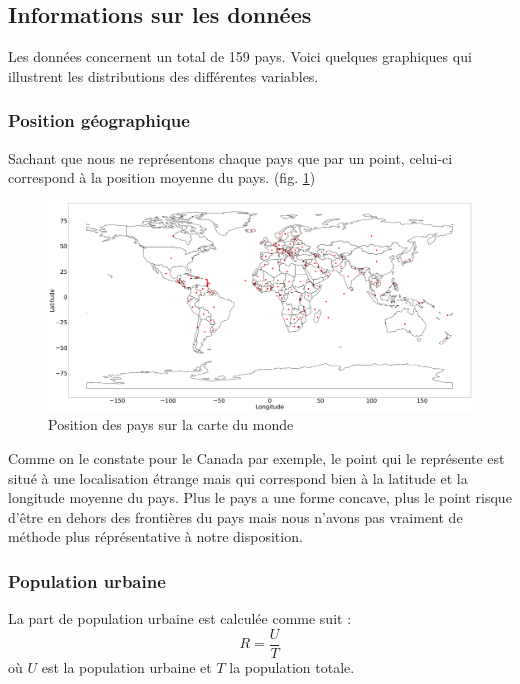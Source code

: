 \documentclass[12pt]{iEEEtran}
\begin{document}
\subsection{Informations sur les données}

Les données concernent un total de 159 pays. Voici quelques graphiques qui illustrent
les distributions des différentes variables.

\subsubsection{Position géographique}

Sachant que nous ne représentons chaque pays que par un point, celui-ci correspond
à la position moyenne du pays. (fig. \ref{fig:loc_world})

\begin{figure}[h]
    \centering
    \includegraphics[width=\columnwidth]{img/loc_world.png}
    \caption{Position des pays sur la carte du monde}
    \label{fig:loc_world}
\end{figure}

Comme on le constate pour le Canada par exemple, le point qui le représente est situé
à une localisation étrange mais qui correspond bien à la latitude et la longitude moyenne
du pays. Plus le pays a une forme concave, plus le point risque d'être en dehors des
frontières du pays mais nous n'avons pas vraiment de méthode plus réprésentative à notre
disposition.

\subsubsection{Population urbaine}

La part de population urbaine est calculée comme suit :
$$ R = \frac{U}{T} $$ où $U$ est la population urbaine et $T$ la population totale.
\end{document}
